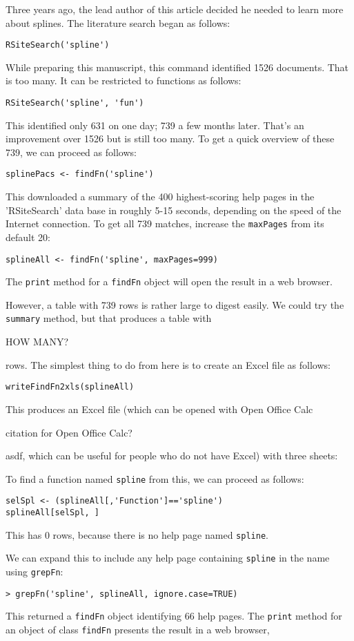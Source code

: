 Three years ago, the lead author of this article decided he 
needed to learn 
more about splines.  The literature search began as follows:  
\begin{verbatim}
RSiteSearch('spline')
\end{verbatim}
While preparing this manuscript, this command identified 1526
documents.  That is too many.  It can be restricted to 
functions as follows:  
\begin{verbatim}
RSiteSearch('spline', 'fun')
\end{verbatim}
This identified only 631 on one day;  739 a few months later.  
That's an improvement over 1526 but is
still too many.  To get a quick overview of these 739, we can
proceed as follows:
\begin{verbatim}
splinePacs <- findFn('spline')
\end{verbatim}
This downloaded a summary of the 400 highest-scoring help pages in
the 'RSiteSearch' data base in roughly 5-15 seconds, depending on the
speed of the Internet connection.  To get all 739 matches, increase 
the {\tt maxPages} from its default 20:  
\begin{verbatim}
splineAll <- findFn('spline', maxPages=999)
\end{verbatim}
The {\tt print} method for a {\tt findFn} object 
will open the result in a web browser.

However, a table with 739 rows is rather large to digest easily.
We could try the {\tt summary} method, but that produces a table
with

HOW MANY?

rows.  The simplest thing to do from here is to create an Excel
file as follows:
\begin{verbatim}
writeFindFn2xls(splineAll)
\end{verbatim}
This produces an Excel file (which can be opened with Open Office
Calc

citation for Open Office Calc?

asdf, which can be useful for people who do not have Excel) with
three sheets:

To find a function named {\tt spline} from this, we can proceed as
follows:
\begin{verbatim}
selSpl <- (splineAll[,'Function']=='spline')
splineAll[selSpl, ]
\end{verbatim}
This has 0 rows, because there is no help page named {\tt spline}.

We can expand this to include any help page containing {\tt spline} in
the name using {\tt grepFn}:
\begin{verbatim}
> grepFn('spline', splineAll, ignore.case=TRUE)
\end{verbatim}
This returned a {\tt findFn} object identifying 66 help pages.
The {\tt print} method for an object of class {\tt findFn}
presents the result in a web browser,


